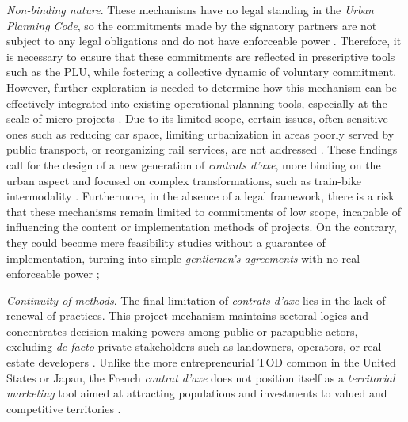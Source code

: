 \begin{refsegment}
\begin{customitemize}
\item \textsl{Non-binding nature}. These mechanisms have no legal standing in the \textsl{Urban Planning Code}, so the commitments made by the signatory partners are not subject to any legal obligations and do not have enforceable power \textcolor{blue}{\autocite[2]{cerema_outils_2021}}. Therefore, it is necessary to ensure that these commitments are reflected in prescriptive tools such as the \acrshort{PLU}, while fostering a collective dynamic of voluntary commitment. However, further exploration is needed to determine how this mechanism can be effectively integrated into existing operational planning tools, especially at the scale of micro-projects \textcolor{blue}{\autocite[53]{cerema_articuler_2015}}. Due to its limited scope, certain issues, often sensitive ones such as reducing car space, limiting urbanization in areas poorly served by public transport, or reorganizing rail services, are not addressed \textcolor{blue}{\autocite[96]{maulat_contractualiser_2015}}. These findings call for the design of a new generation of \textsl{contrats d’axe}, more binding on the urban aspect and focused on complex transformations, such as train-bike \gls{intermodality} \textcolor{blue}{\autocite[17]{haro_ligne_2021}}. Furthermore, in the absence of a legal framework, there is a risk that these mechanisms remain limited to commitments of low scope, incapable of influencing the content or implementation methods of projects. On the contrary, they could become mere feasibility studies without a guarantee of implementation, turning into simple \textsl{gentlemen’s agreements} with no real enforceable power \textcolor{blue}{\autocite[53]{cerema_articuler_2015}};
\item \textsl{Continuity of methods}. The final limitation of \textsl{contrats d’axe} lies in the lack of renewal of practices. This project mechanism maintains sectoral logics and concentrates decision-making powers among public or parapublic actors, excluding \textsl{de facto} private stakeholders such as landowners, operators, or real estate developers \textcolor{blue}{\autocites[96]{maulat_contractualiser_2015}[2]{cerema_outils_2021}}. Unlike the more entrepreneurial \acrshort{TOD} common in the United States or Japan, the French \textsl{contrat d’axe} does not position itself as a \textsl{territorial marketing} tool aimed at attracting populations and investments to valued and competitive territories \textcolor{blue}{\autocite[120]{bentayou_contrat_2015}}.%
    \end{customitemize}


\end{refsegment}
